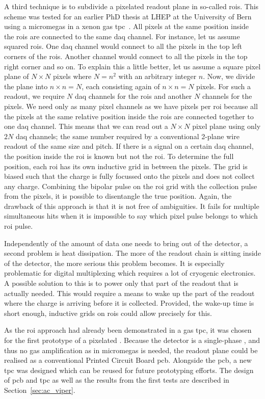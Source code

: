 A third technique is to subdivide a pixelated readout plane in so-called \glspl{roi}.
This scheme was tested for an earlier PhD thesis at LHEP at the University of Bern using a \gls{micromegas} in a xenon gas \gls{tpc}~\cite{maplesyrup}.
All pixels at the same position inside the \glspl{roi} are connected to the same \gls{daq} channel.
For instance, let us assume squared \glspl{roi}.
One \gls{daq} channel would connect to all the pixels in the top left corners of the \glspl{roi}.
Another channel would connect to all the pixels in the top right corner and so on.
To explain this a little better, let us assume a square pixel plane of $N \times N$ pixels where $N = n ^ 2$ with an arbitrary integer $n$.
Now, we divide the plane into $n \times n = N$, each consisting again of $n \times n = N$ pixels.
For such a readout, we require $N$ \gls{daq} channels for the \glspl{roi} and another $N$ channels for the pixels.
We need only as many pixel channels as we have pixels per \gls{roi} because all the pixels at the same relative position inside the \glspl{roi} are connected together to one \gls{daq} channel.
This means that we can read out a $N \times N$ pixel plane using only $2 N$ \gls{daq} channels; the same number required by a conventional 2-plane wire readout of the same size and pitch.
If there is a signal on a certain \gls{daq} channel, the position inside the \gls{roi} is known but not the \gls{roi}.
To determine the full position, each \gls{roi} has its own inductive grid in between the pixels.
The grid is biased such that the charge is fully focussed onto the pixels and does not collect any charge.
Combining the bipolar pulse on the \gls{roi} grid with the collection pulse from the pixels, it is possible to disentangle the true position.
Again, the drawback of this approach is that it is not free of ambiguities.
It fails for multiple simultaneous hits when it is impossible to say which pixel pulse belongs to which \gls{roi} pulse.

Independently of the amount of data one needs to bring out of the detector, a second problem is heat dissipation.
The more of the readout chain is sitting inside of the detector, the more serious this problem becomes.
It is especially problematic for digital multiplexing which requires a lot of cryogenic electronics.
A possible solution to this is to power only that part of the readout that is actually needed.
This would require a means to wake up the part of the readout where the charge is arriving before it is collected.
Provided, the wake-up time is short enough, inductive grids on \glspl{roi} could allow precisely for this.

As the \gls{roi} approach had already been demonstrated in a gas \gls{tpc}, it was chosen for the first prototype of a pixelated \lartpc{}.
Because the detector is a single-phase \lartpc{}, and thus no gas amplification as in \gls{micromegas} is needed, the readout plane could be realised as a conventional Printed Circuit Board \gls{pcb}.
Alongside the \gls{pcb}, a new \gls{tpc} was designed which can be reused for future prototyping efforts.
The design of \gls{pcb} and \gls{tpc} as well as the results from the first tests are described in Section~\ref{sec:ac_viper}.